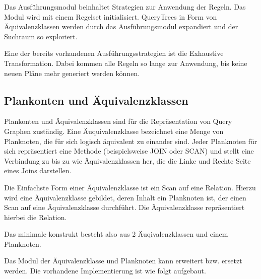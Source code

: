 Das Ausführungsmodul beinhaltet Strategien zur Anwendung der Regeln. Das Modul wird mit einem Regelset initialisiert. QueryTrees in Form von Äquivalenzklassen werden durch das Ausführungsmodul expandiert und der Suchraum so exploriert.

Eine der bereits vorhandenen Ausführungsstrategien ist die Exhaustive Transformation. Dabei kommen alle Regeln so lange zur Anwendung, bis keine neuen Pläne mehr generiert werden können.


\subsection{Plankonten und Äquivalenzklassen}

Plankonten und Äquivalenzklassen sind für die Repräsentation von Query Graphen zuständig. Eine Äuquivalenzklasse bezeichnet eine Menge von Planknoten, die für sich logisch äquivalent zu einander sind. Jeder Planknoten für sich repräsentiert eine Methode (beispielsweise JOIN oder SCAN) und stellt eine Verbindung zu bis zu wie Äquivalenzklassen her, die die Linke und Rechte Seite eines Joins darstellen.

Die Einfachste Form einer Äquivalenzklasse ist ein Scan auf eine Relation. Hierzu wird eine Äquivalenzklasse gebildet, deren Inhalt ein Planknoten ist, der einen Scan auf eine Äquivalenzklasse durchführt. Die Äquivalenzklasse repräsentiert hierbei die Relation.

Das minimale konstrukt besteht also aus 2 Äuqivalenzklassen und einem Planknoten.


Das Modul der Äquivalenzklasse und Planknoten kann erweitert bzw. ersetzt werden. Die vorhandene Implementierung ist wie folgt aufgebaut.
